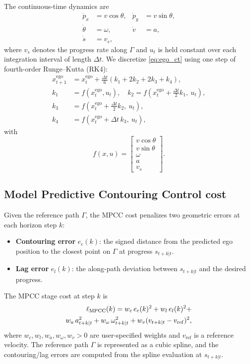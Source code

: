 \documentclass[letterpaper,10pt,conference]{ieeeconf}
\begin{document}
The continuous-time dynamics are
\begin{subequations}\label{eq:ego_ct}
\begin{align}
\dot p_x &= v\cos\theta, &
\dot p_y &= v\sin\theta, \\
\dot \theta &= \omega, &
\dot v &= a, \\
\dot s &= v_s,
\end{align}
\end{subequations}
where $v_s$ denotes the progress rate along $\Gamma$ and $u_t$ is held constant over each integration interval of length $\Delta t$.
We discretize \eqref{eq:ego_ct} using one step of fourth-order Runge--Kutta (RK4):
\begin{subequations}\label{eq:ego_dyn_rk4}
\begin{align}
x_{t+1}^{\mathrm{ego}} &= x_t^{\mathrm{ego}} + \frac{\Delta t}{6}\left(k_1 + 2k_2 + 2k_3 + k_4\right),\\
k_1 &= f\!\left(x_t^{\mathrm{ego}},u_t\right),\quad
k_2 = f\!\left(x_t^{\mathrm{ego}} + \frac{\Delta t}{2}k_1,\ u_t\right),\\
k_3 &= f\!\left(x_t^{\mathrm{ego}} + \frac{\Delta t}{2}k_2,\ u_t\right), \\
k_4 & = f\!\left(x_t^{\mathrm{ego}} + \Delta t\,k_3,\ u_t\right),
\end{align}
\end{subequations}
with
\[
f(x,u)=
\begin{bmatrix}
v\cos\theta\\
v\sin\theta\\
\omega\\
a\\
v_s
\end{bmatrix}.
\]

\subsection{Model Predictive Contouring Control cost}

Given the reference path $\Gamma$, the MPCC cost penalizes two geometric errors at each horizon step $k$:
\begin{itemize}
    \item \textbf{Contouring error} $e_c(k)$: the signed distance from the predicted ego position to the closest point on $\Gamma$ at progress $s_{t+k|t}$.
    \item \textbf{Lag error} $e_l(k)$: the along-path deviation between $s_{t+k|t}$ and the desired progress.
\end{itemize}
The MPCC stage cost at step $k$ is
\begin{align}
    \ell_{\mathrm{MPCC}}(k) = w_c\, e_c(k)^2 + w_l\, e_l(k)^2 + \notag \\ w_a\, a_{t+k|t}^2 + w_\omega\, \omega_{t+k|t}^2 + w_v (v_{t+k|t} - v_{\mathrm{ref}})^2, \label{eq:mpcc_cost}
\end{align}
where $w_c, w_l, w_a, w_\omega, w_v > 0$ are user-specified weights and $v_{\mathrm{ref}}$ is a reference velocity. The reference path $\Gamma$ is represented as a cubic spline, and the contouring/lag errors are computed from the spline evaluation at $s_{t+k|t}$.
\end{document}
